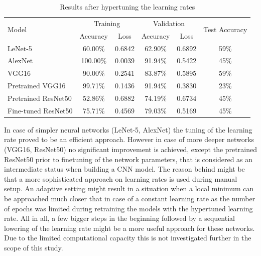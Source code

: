 \documentclass[10pt, final]{article}
\begin{document}
\begin{table}[!ht]
	\centering
	\begin{tabular}{l c c c c c}
		\multirow{2}{*}{Model} & \multicolumn{2}{c}{Training} & \multicolumn{2}{c}{Validation} & \multirow{2}{*}{Test Accuracy}                                              \\
		                       & Accuracy                     & Loss                           & Accuracy                       & Loss                  &                    \\
		\hline
		LeNet-5                & {\color{red} 60.00\%}        & {\color{red} 0.6842}           & {\color{red} 62.90\%}          & {\color{red} 0.6892}  & 59\%               \\
		AlexNet                & {\color{red} 100.00\%}       & {\color{red} 0.0039}           & {\color{red} 91.94\%}          & {\color{red} 0.5422}  & {\color{red} 45\%} \\
		VGG16                  & 90.00\%                      & 0.2541                         & 83.87\%                        & 0.5895                & 59\%               \\
		Pretrained VGG16       & {\color{red} 99.71\%}        & {\color{red} 0.1436}           & 91.94\%                        & {\color{red} 0.3830}  & {\color{red} 23\%} \\
		Pretrained ResNet50    & {\color{red} 52.86\%}        & {\color{red} 0.6882}           & {\color{red} 74.19\%}          & {\color{red} 0.6734}  & 45\%               \\
		Fine-tuned ResNet50    & {\color{red} 75.71\%}        & {\color{red} 0.4569 }          & {\color{red} 79.03\%}          & {\color{red} 0.5169 } & 45\%               \\
		\hline
	\end{tabular}
	\caption{Results after hypertuning the learning rates}
	\label{table:results_keras_tuner}
\end{table}

In case of simpler neural networks (LeNet-5, AlexNet) the tuning of the learning rate proved to be an efficient approach.
However in case of more deeper networks (VGG16, ResNet50) no significant improvement is achieved, except the pretrained ResNet50
prior to finetuning of the network parameters, that is considered as an intermediate status when building a CNN model.
The reason behind might be that a more sophisticated approach on learning rates is used during manual setup.
An adaptive setting might result in a situation when a local minimum can be approached much closer that in case of a constant learning
rate as the number of epochs was limited during retraining the models with the hypertuned learning rate.
All in all, a few bigger steps in the beginning followed by a sequential lowering of the learning rate might be a more useful approach
for these networks.
Due to the limited computational capacity this is not investigated further in the scope of this study.
\end{document}
